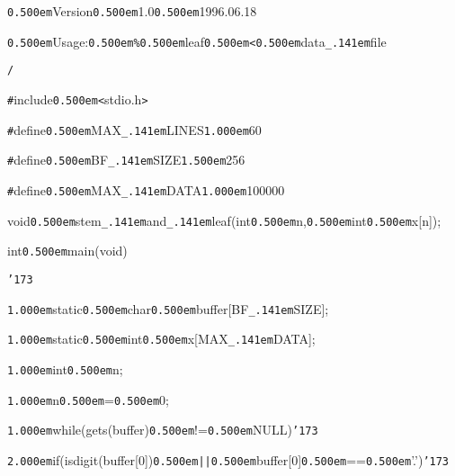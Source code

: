 \documentclass[uplatex,a4paper]{jsarticle}
\begin{document}
\noindent
{\tt\mc \kern0.500em}Version{\tt\mc \kern0.500em}1.0{\tt\mc \kern0.500em}1996.06.18

\noindent
{\tt\mc \kern0.500em}Usage:{\tt\mc \kern0.500em}{\tt\%}{\tt\mc \kern0.500em}leaf{\tt\mc \kern0.500em}{\tt <}{\tt\mc \kern0.500em}data{\tt\_\kern.141em}file

\noindent
{\tt *}{\tt *}{\tt *}{\tt *}{\tt *}{\tt *}{\tt *}{\tt *}{\tt *}{\tt *}{\tt *}{\tt *}{\tt *}{\tt *}{\tt *}{\tt *}{\tt *}{\tt *}{\tt *}{\tt *}{\tt *}{\tt *}{\tt *}{\tt *}{\tt *}{\tt *}{\tt *}{\tt *}{\tt *}{\tt *}{\tt *}{\tt *}{\tt *}{\tt *}{\tt *}{\tt *}{\tt *}{\tt *}{\tt *}{\tt *}{\tt *}{\tt *}{\tt *}{\tt *}{\tt *}{\tt *}{\tt *}{\tt *}{\tt *}{\tt *}{\tt *}{\tt *}{\tt *}{\tt *}{\tt *}{\tt *}{\tt *}{\tt *}{\tt *}{\tt *}{\tt *}{\tt *}{\tt *}{\tt *}{\tt *}{\tt *}{\tt /}\tt\mc 

\noindent
{\tt\#}include{\tt\mc \kern0.500em}{\tt <}stdio.h{\tt >}

\noindent
\hfill

\noindent
{\tt\#}define{\tt\mc \kern0.500em}MAX{\tt\_\kern.141em}LINES{\tt\mc \kern1.000em}60

\noindent
{\tt\#}define{\tt\mc \kern0.500em}BF{\tt\_\kern.141em}SIZE{\tt\mc \kern1.500em}256

\noindent
{\tt\#}define{\tt\mc \kern0.500em}MAX{\tt\_\kern.141em}DATA{\tt\mc \kern1.000em}100000

\noindent
\hfill

\noindent
void{\tt\mc \kern0.500em}stem{\tt\_\kern.141em}and{\tt\_\kern.141em}leaf(int{\tt\mc \kern0.500em}n,{\tt\mc \kern0.500em}int{\tt\mc \kern0.500em}x[n]);

\noindent
\hfill

\noindent
int{\tt\mc \kern0.500em}main(void)

\noindent
{\tt\char'173}

\noindent
{\tt\mc \kern1.000em}static{\tt\mc \kern0.500em}char{\tt\mc \kern0.500em}buffer[BF{\tt\_\kern.141em}SIZE];

\noindent
{\tt\mc \kern1.000em}static{\tt\mc \kern0.500em}int{\tt\mc \kern0.500em}x[MAX{\tt\_\kern.141em}DATA];

\noindent
{\tt\mc \kern1.000em}int{\tt\mc \kern0.500em}n;

\noindent
{\tt\mc \kern1.000em}n{\tt\mc \kern0.500em}={\tt\mc \kern0.500em}0;

\noindent
{\tt\mc \kern1.000em}while(gets(buffer){\tt\mc \kern0.500em}!={\tt\mc \kern0.500em}NULL){\tt\char'173}

\noindent
{\tt\mc \kern2.000em}if(isdigit(buffer[0]){\tt\mc \kern0.500em}{\tt |}{\tt |}{\tt\mc \kern0.500em}buffer[0]{\tt\mc \kern0.500em}=={\tt\mc \kern0.500em}'.'){\tt\char'173}
\end{document}
